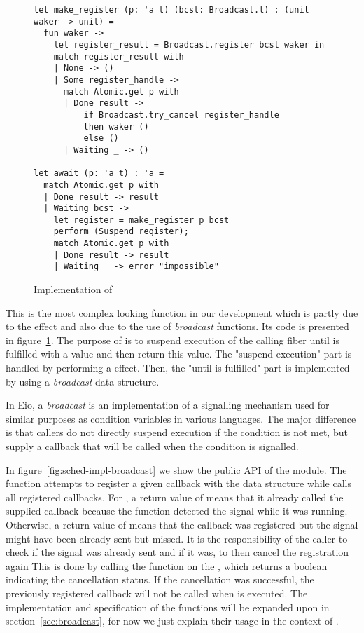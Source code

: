 \begin{figure}[ht]
  \begin{verbatim}
let make_register (p: 'a t) (bcst: Broadcast.t) : (unit waker -> unit) = 
  fun waker ->
    let register_result = Broadcast.register bcst waker in
    match register_result with
    | None -> ()
    | Some register_handle ->
      match Atomic.get p with
      | Done result ->  
          if Broadcast.try_cancel register_handle
          then waker ()
          else ()
      | Waiting _ -> ()

let await (p: 'a t) : 'a = 
  match Atomic.get p with
  | Done result -> result
  | Waiting bcst ->
    let register = make_register p bcst
    perform (Suspend register);
    match Atomic.get p with
    | Done result -> result 
    | Waiting _ -> error "impossible"
  \end{verbatim}
  \caption{Implementation of }
  \label{fig:sched-impl-await}
\end{figure}

This is the most complex looking function in our development which is partly due to the \esuspend{} effect and also due to the use of \emph{broadcast} functions.
Its code is presented in figure~\ref{fig:sched-impl-await}.
The purpose of  is to suspend execution of the calling fiber until  is fulfilled with a value and then return this value.
The "suspend execution" part is handled by performing a \esuspend{} effect.
Then, the "until  is fulfilled" part is implemented by using a \emph{broadcast} data structure.

In Eio, a \emph{broadcast} is an implementation of a signalling mechanism used for similar purposes as condition variables in various languages.
The major difference is that callers do not directly suspend execution if the condition is not met, but supply a callback that will be called when the condition is signalled.

In figure~\ref{fig:sched-impl-broadcast} we show the public API of the  module.
The  function attempts to register a given callback with the data structure while  calls all registered callbacks.
For , a return value of  means that it already called the supplied callback because the function detected the signal while it was running.
Otherwise, a return value of  means that the callback was registered but the signal might have been already sent but missed.
It is the responsibility of the caller to check if the signal was already sent and if it was, to then cancel the registration again
This is done by calling the  function on the , which returns a boolean indicating the cancellation status.
If the cancellation was successful, the previously registered callback will not be called when  is executed.
The implementation and specification of the functions will be expanded upon in section~\ref{sec:broadcast}, for now we just explain their usage in the context of .

